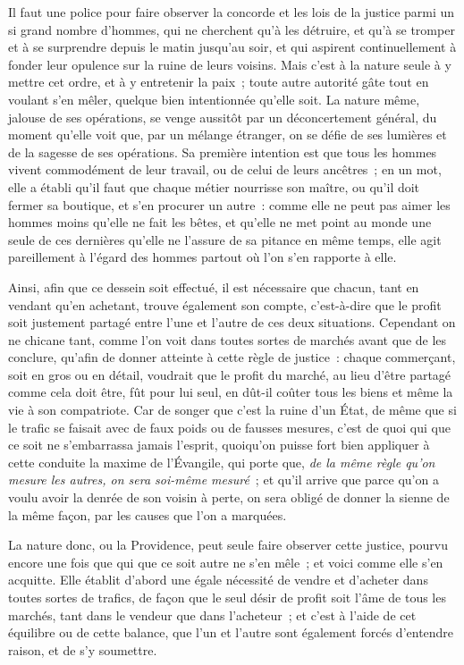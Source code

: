 \documentclass[french,twoside]{book} %
\begin{document}
Il faut une police pour faire observer la concorde et les lois de la justice parmi un si grand nombre d’hommes, qui ne cherchent qu’à les détruire, et qu’à se tromper et à se surprendre depuis le matin jusqu’au soir, et qui aspirent continuellement à fonder leur opulence sur la ruine de leurs voisins. Mais c’est à la nature seule à y mettre cet ordre, et à y entretenir la paix ; toute autre autorité gâte tout en voulant s’en mêler, quelque bien intentionnée qu’elle soit. La nature même, jalouse de ses opérations, se venge aussitôt par un déconcertement général, du moment qu’elle voit que, par un mélange étranger, on se défie de ses lumières et de la sagesse de ses opérations. Sa première intention est que tous les hommes vivent commodément de leur travail, ou de celui de leurs ancêtres ; en un mot, elle a établi qu’il faut que chaque métier nourrisse son maître, ou qu’il doit fermer sa boutique, et s’en procurer un autre : comme elle ne peut pas aimer les hommes moins qu’elle ne fait les bêtes, et qu’elle ne met point au monde une seule de ces dernières qu’elle ne l’assure de sa pitance en même temps, elle agit pareillement à l’égard des hommes partout où l’on s’en rapporte à elle.\par
Ainsi, afin que ce dessein soit effectué, il est nécessaire que chacun, tant en vendant qu’en achetant, trouve également son compte, c’est-à-dire que le profit soit justement partagé entre l’une et l’autre de ces deux situations. Cependant on ne chicane tant, comme l’on voit dans toutes sortes de marchés avant que de les conclure, qu’afin de donner atteinte à cette règle de justice : chaque commerçant, soit en gros ou en détail, voudrait que le profit du marché, au lieu d’être partagé comme cela doit être, fût pour lui seul, en dût-il coûter tous les biens et même la vie à son compatriote. Car de songer que c’est la ruine d’un État, de même que si le trafic se faisait avec de faux poids ou de fausses mesures, c’est de quoi qui que ce soit ne s’embarrassa jamais l’esprit, quoiqu’on puisse fort bien appliquer à cette conduite la maxime de l’Évangile, qui porte que, {\itshape de la même règle qu’on mesure les autres, on sera soi-même mesuré} ; et qu’il arrive que parce qu’on a voulu avoir la denrée de son voisin à perte, on sera obligé de donner la sienne de la même façon, par les causes que l’on a marquées.\par
La nature donc, ou la Providence, peut seule faire observer cette justice, pourvu encore une fois que qui que ce soit autre ne s’en mêle ; et voici comme elle s’en acquitte. Elle établit d’abord une égale nécessité de vendre et d’acheter dans toutes sortes de trafics, de façon que le seul désir de profit soit l’âme de tous les marchés, tant dans le vendeur que dans l’acheteur ; et c’est à l’aide de cet équilibre ou de cette balance, que l’un et l’autre sont également forcés d’entendre raison, et de s’y soumettre.\par
\end{document}
